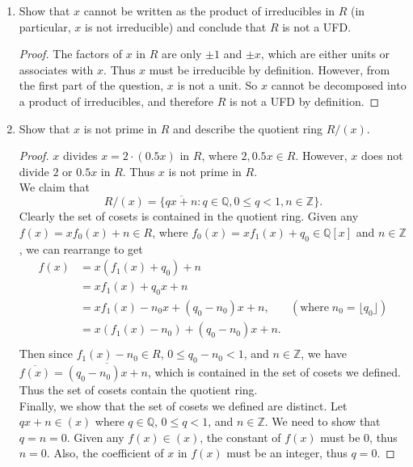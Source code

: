 \documentclass{article}
\begin{document}
\begin{enumerate}[label={(\alph*)}]
    \item Show that $x$ cannot be written as the product of irreducibles in
      $R$ (in particular, $x$ is not irreducible) and conclude that $R$ is
      not a UFD.

      \begin{proof}
        The factors of $x$ in $R$ are only $\pm1$ and $\pm x$, which
        are either units or associates with $x$. Thus $x$ must be
        irreducible by definition. However, from the first part of the
        question, $x$ is not a unit. So $x$ cannot be decomposed into a
        product of irreducibles, and therefore $R$ is not a UFD by
        definition.
      \end{proof}

    \item Show that $x$ is not prime in $R$ and describe the quotient ring
      $R/(x)$.
      \begin{proof}
        $x$ divides $x=2\cdot(0.5x)$ in $R$, where $2,0.5x\in R$. However,
        $x$ does not divide $2$ or $0.5x$ in $R$. Thus $x$ is not prime in
        $R$. \\

        We claim that
        \[R/(x)= \{\overline{qx+n}:q\in\mathbb{Q},0\leq q<1,
          n\in\mathbb{Z}\}.\]
        Clearly the set of cosets is contained in the quotient ring. Given
        any $f(x)=xf_0(x)+n\in R$, where
        $f_0(x)=xf_1(x)+q_0\in\mathbb{Q}[x]$ and $n\in\mathbb{Z}$, we can
        rearrange to get
        \begin{align*}
          f(x) &=x(f_1(x)+q_0)+n \\
          &=xf_1(x)+q_0x+n \\
          &=xf_1(x)-n_0x+(q_0-n_0)x+n, &(\text{where}\; n_0=\lfloor
            q_0\rfloor) \\
          &=x(f_1(x)-n_0)+(q_0-n_0)x+n. \\
        \end{align*}
        Then since $f_1(x)-n_0\in R$, $0\leq q_0-n_0<1$, and
        $n\in\mathbb{Z}$, we have
        $\overline{f(x)}=\overline{(q_0-n_0)x+n}$, which is contained in
        the set of cosets we defined. Thus the set of cosets contain the
        quotient ring. \\

        Finally, we show that the set of cosets we defined are distinct.
        Let $qx+n\in(x)$ where $q\in\mathbb{Q}$, $0\leq q<1$, and
        $n\in\mathbb{Z}$. We need to show that $q=n=0$. Given any
        $f(x)\in(x)$, the constant of $f(x)$ must be 0, thus $n=0$. Also,
        the coefficient of $x$ in $f(x)$ must be an integer, thus $q=0$.
      \end{proof}
  \end{enumerate}
\end{document}

